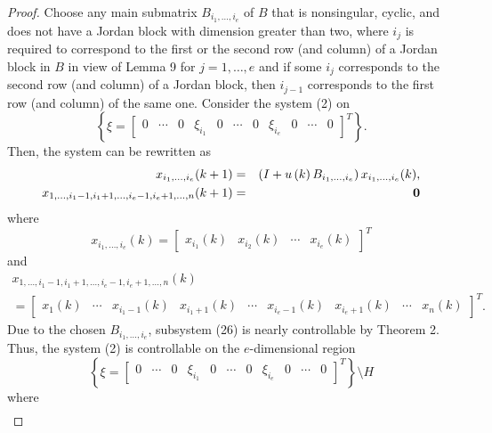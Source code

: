 \documentclass[journal,a4paper,12pt,onecolumn]{IEEEtran}
\begin{document}
\begin{proof}
Choose any main submatrix $B_{i_{1},\ldots ,i_{e}}$ of $B$ that is
nonsingular, cyclic, and does not have a Jordan block with dimension greater
than two, where $i_{j}$ is required to correspond to the first or the second
row (and column) of a Jordan block in $B$ in view of Lemma 9 for $j=1,\ldots
,e$ and if some $i_{j}$ corresponds to the second row (and column) of a
Jordan block, then $i_{j-1}$ corresponds to the first row (and column) of
the same one. Consider the system (2) on\begin{equation*}
\left\{ \xi =\left[
\begin{array}{ccccccccccc}
0 & \cdots & 0 & \xi _{i_{1}} & 0 & \cdots & 0 & \xi _{i_{e}} & 0 & \cdots &
0\end{array}\right] ^{T}\right\} .
\end{equation*}Then, the system can be rewritten as\begin{eqnarray}
x_{i_{1},\ldots ,i_{e}}(k+1) &=&\left( I+u\left( k\right) B_{i_{1},\ldots
,i_{e}}\right) x_{i_{1},\ldots ,i_{e}}(k), \\
x_{1,\ldots ,i_{1}-1,i_{1}+1,\ldots ,i_{e}-1,i_{e}+1,\ldots ,n}(k+1) &=&\mathbf{0}  \notag
\end{eqnarray}where\begin{equation*}
x_{i_{1},\ldots ,i_{e}}(k)=\left[
\begin{array}{cccc}
x_{i_{1}}(k) & x_{i_{2}}(k) & \cdots & x_{i_{e}}(k)\end{array}\right] ^{T}
\end{equation*}and\begin{multline*}
x_{1,\ldots ,i_{1}-1,i_{1}+1,\ldots ,i_{e}-1,i_{e}+1,\ldots ,n}(k) \\
=\left[
\begin{array}{ccccccccc}
x_{1}(k) & \cdots & x_{i_{1}-1}(k) & x_{i_{1}+1}(k) & \cdots & x_{i_{e}-1}(k)
& x_{i_{e}+1}(k) & \cdots & x_{n}(k)\end{array}\right] ^{T}.
\end{multline*}Due to the chosen $B_{i_{1},\ldots ,i_{e}}$, subsystem (26) is nearly
controllable by Theorem 2. Thus, the system (2) is controllable on the $e $-dimensional region\begin{equation}
\left\{ \xi =\left[
\begin{array}{ccccccccccc}
0 & \cdots & 0 & \xi _{i_{1}} & 0 & \cdots & 0 & \xi _{i_{e}} & 0 & \cdots &
0\end{array}\right] ^{T}\right\} \setminus H
\end{equation}where\begin{multline*}

\end{multline*}
\end{proof}
\end{document}
